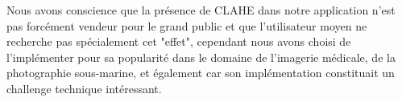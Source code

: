 Nous avons conscience que la présence de CLAHE dans notre application n'est pas forcément vendeur pour le grand public 
et que l'utilisateur moyen ne recherche pas spécialement cet "effet", cependant nous avons choisi de l'implémenter pour sa popularité dans le domaine
de l'imagerie médicale, de la photographie sous-marine, et également car son implémentation constituait un challenge technique intéressant.